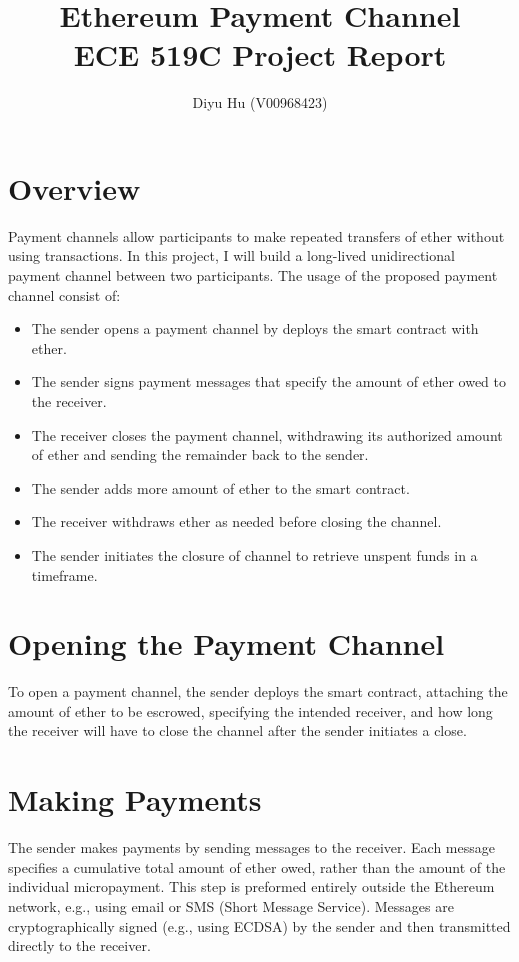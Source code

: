 \documentclass[11pt]{article}
\title{Ethereum Payment Channel\\ECE 519C Project Report}
\author{Diyu Hu (V00968423)}
\begin{document}
    \maketitle


    \section{Overview}\label{sec:overview}
    Payment channels allow participants to make repeated transfers of ether without using transactions.
    In this project, I will build a long-lived unidirectional payment channel between two participants.
    The usage of the proposed payment channel consist of:
    \begin{itemize}
        \item The sender opens a payment channel by deploys the smart contract with ether.
        \item The sender signs payment messages that specify the amount of ether owed to the receiver.
        \item The receiver closes the payment channel, withdrawing its authorized amount of ether and sending the
        remainder back to the sender.
        \item The sender adds more amount of ether to the smart contract.
        \item The receiver withdraws ether as needed before closing the channel.
        \item The sender initiates the closure of channel to retrieve unspent funds in a timeframe.
    \end{itemize}


    \section{Opening the Payment Channel}\label{sec:opening-the-payment-channel}
    To open a payment channel, the sender deploys the smart contract, attaching the amount of ether to be escrowed,
    specifying the intended receiver, and how long the receiver will have to close the channel after the sender
    initiates a close.
    


    \section{Making Payments}\label{sec:making-payments}
    The sender makes payments by sending messages to the receiver.
    Each message specifies a cumulative total amount of ether owed, rather than the amount of the individual
    micropayment.
    This step is preformed entirely outside the Ethereum network, e.g., using email or SMS (Short Message Service).
    Messages are cryptographically signed (e.g., using ECDSA) by the sender and then transmitted directly to the
    receiver.
\end{document}

